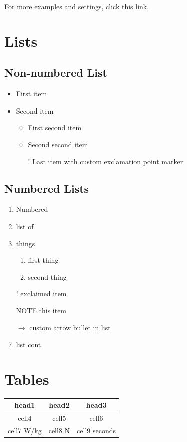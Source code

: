 \documentclass{article}
\begin{document}
For more examples and settings, \href{http://overleaf.com/learn/latex/Inserting_Images}{click this link.}

\pagebreak


\section{Lists}

\subsection{Non-numbered List}
\begin{itemize}
	\item First item
	\item Second item
	\begin{itemize}
		\item First second item
		\item Second second item
	\item[!] Last item with custom exclamation point marker	
	\end{itemize}
\end{itemize}

\subsection{Numbered Lists}
\begin{enumerate}
	\item Numbered
	\item list of 
	\item things
	\begin{enumerate}
		\item first thing
		\item second thing
	\end{enumerate}
	\item[!] exclaimed item
	\item[NOTE] this item
	\item[$\rightarrow$] custom arrow bullet in list
	\item list cont.
\end{enumerate}


\section{Tables}
\begin{center}
\begin{tabular}{ ||c|c|c|| } 
 \hline
 \textbf{head1} & \textbf{head2} & \textbf{head3} \\ 
 \hline
 \hline
 cell4 & cell5 & cell6 \\ 
 \hline
 cell7 W/kg  & 
 cell8 N  & 
 cell9 seconds \\ 
 \hline
\end{tabular}
\end{center}
\end{document}
